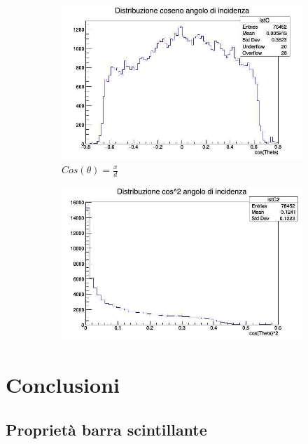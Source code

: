 \documentclass[a4paper]{article}
\begin{document}
\begin{figure}[H]
\begin{subfigure}[b]{0.4\textwidth}
\includegraphics[width=\textwidth]{./immagini/TimeOfFlight/DistrCos.jpg}
\caption{$Cos(\theta) = \frac{x}{d}$}
\label{fig:DistrCos}
\end{subfigure}
\hfill
\begin{subfigure}[b]{0.4\textwidth}
\includegraphics[width=\textwidth]{./immagini/TimeOfFlight/DistrCos2.jpg}
\caption{}
\label{fig:DistrCos2}
\end{subfigure}
\end{figure}

\section{Conclusioni}
\subsection{Proprietà barra scintillante}
\end{document}
